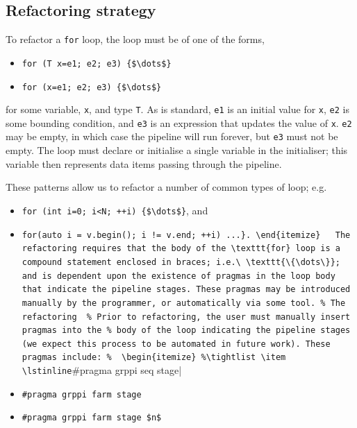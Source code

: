 %

\subsection{Refactoring strategy}\label{refactoring-strategy}

To refactor a \texttt{for} loop, the loop must be of one of the forms,
% 
\begin{itemize}
\item
  \lstinline[mathescape]|for (T x=e1; e2; e3) {$\dots$}|
\item
  \lstinline[mathescape]|for (x=e1; e2; e3) {$\dots$}|
\end{itemize}

\noindent
for some variable, \texttt{x}, and type \texttt{T}.
As is standard,
\texttt{e1} is an initial value for \texttt{x}, \texttt{e2} is some
bounding condition, and \texttt{e3} is an expression that updates the
value of \texttt{x}. \texttt{e2} may be empty, in which case the
pipeline will run forever, but \texttt{e3} must not be empty. The
loop must declare or initialise a
single variable in the initialiser; this variable then represents data
items passing through the pipeline.

These patterns allow us to refactor a number of common types of loop; e.g.
\begin{itemize}
\item \lstinline[mathescape]|for (int i=0; i<N; ++i) {$\dots$}|, and
\item \lstinline|for(auto i = v.begin(); i != v.end; ++i) ...}.
\end{itemize}


The refactoring requires that the body of the \texttt{for} loop is a compound statement enclosed in braces; i.e.\ \texttt{\{\dots\}}; and is dependent upon the existence of pragmas in the loop body that indicate the pipeline stages. These pragmas may be introduced manually by the programmer, or automatically via some tool.
% The refactoring 
% Prior to refactoring, the user must manually insert pragmas into the
% body of the loop indicating the pipeline stages (we expect this process to be automated in future work).
These pragmas include:
% 
\begin{itemize}
%\tightlist
\item
  \lstinline|#pragma grppi seq stage|
\item
  \lstinline|#pragma grppi farm stage|
\item
  \lstinline[mathescape]|#pragma grppi farm stage $n$|
\end{itemize}

